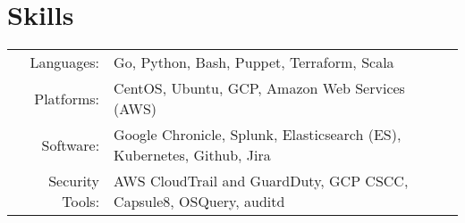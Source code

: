 \documentclass[letterpaper]{article}
\begin{document}

\section*{Skills}
\begin{tabular}{rl}
 	Languages: & Go, Python, Bash, Puppet, Terraform, Scala\\
	Platforms: & CentOS, Ubuntu, GCP, Amazon Web Services (AWS)\\
  	Software: & Google Chronicle, Splunk, Elasticsearch (ES), Kubernetes, Github, Jira\\
	Security Tools: & AWS CloudTrail and GuardDuty, GCP CSCC, Capsule8, OSQuery, auditd\\
\end{tabular}
\end{document}
